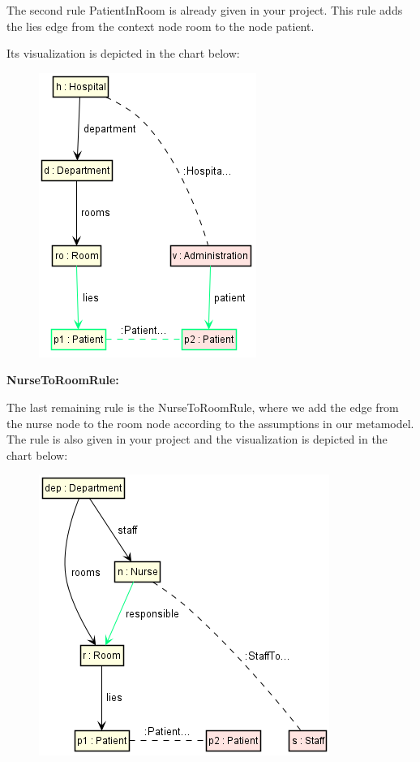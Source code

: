 \clearpage

The second rule \textsf{PatientInRoom} is already given in your project. This rule adds the \textsf{lies} edge from the context node \textsf{room} to the node \textsf{patient}.\newline

Its visualization is depicted in the chart below:

\begin{figure}[h]
    \centering
    \includegraphics[scale=0.65 ]{pictures/PatientInRoomRule.png}
    \caption{}
    \label{PatientInRoomRule}
\end{figure}

\textbf{NurseToRoomRule:}

The last remaining rule is the \textsf{NurseToRoomRule}, where we add the edge from the nurse node to the room node according to the assumptions in our metamodel. The rule is also given in your project and the visualization is depicted in the chart below:

\begin{figure}[h]
    \centering
    \includegraphics[scale=0.65 ]{pictures/NurseToRoomRule.png}
    \caption{}
    \label{PatientInRoomRule}
\end{figure}

